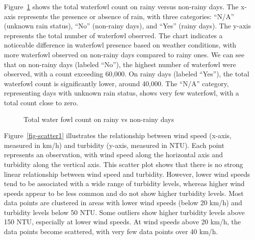 \documentclass[
  letterpaper,
  DIV=11,
  numbers=noendperiod]{scrartcl}
\begin{document}
Figure~\ref{fig-bar3} shows the total waterfowl count on rainy versus
non-rainy days. The x-axis represents the presence or absence of rain,
with three categories: ``N/A'' (unknown rain status), ``No'' (non-rainy
days), and ``Yes'' (rainy days). The y-axis represents the total number
of waterfowl observed. The chart indicates a noticeable difference in
waterfowl presence based on weather conditions, with more waterfowl
observed on non-rainy days compared to rainy ones. We can see that on
non-rainy days (labeled ``No''), the highest number of waterfowl were
observed, with a count exceeding 60,000. On rainy days (labeled
``Yes''), the total waterfowl count is significantly lower, around
40,000. The ``N/A'' category, representing days with unknown rain
status, shows very few waterfowl, with a total count close to zero.

\begin{figure}


\caption{\label{fig-bar3}Total water fowl count on rainy vs non-rainy
days}

\end{figure}%

Figure~\ref{fig-scatter1} illustrates the relationship between wind
speed (x-axis, measured in km/h) and turbidity (y-axis, measured in
NTU). Each point represents an observation, with wind speed along the
horizontal axis and turbidity along the vertical axis. This scatter plot
shows that there is no strong linear relationship between wind speed and
turbidity. However, lower wind speeds tend to be associated with a wide
range of turbidity levels, whereas higher wind speeds appear to be less
common and do not show higher turbidity levels. Most data points are
clustered in areas with lower wind speeds (below 20 km/h) and turbidity
levels below 50 NTU. Some outliers show higher turbidity levels above
150 NTU, especially at lower wind speeds. At wind speeds above 20 km/h,
the data points become scattered, with very few data points over 40
km/h.
\end{document}
